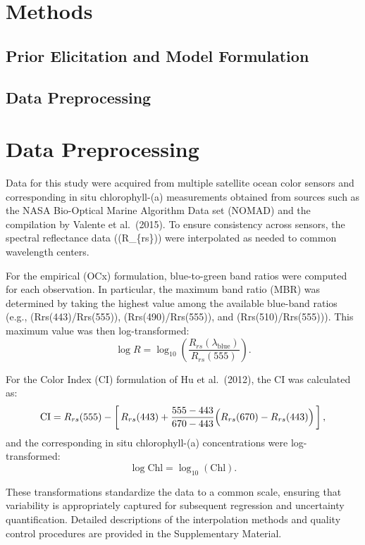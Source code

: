\documentclass[
]{agujournal2019}
\begin{document}
\section{Methods}\label{methods}

\subsection{Prior Elicitation and Model
Formulation}\label{prior-elicitation-and-model-formulation}

\subsection{Data Preprocessing}\label{data-preprocessing}

\section{Data Preprocessing}

Data for this study were acquired from multiple satellite ocean color
sensors and corresponding in situ chlorophyll-(a) measurements obtained
from sources such as the NASA Bio-Optical Marine Algorithm Data set
(NOMAD) and the compilation by Valente et al.~(2015). To ensure
consistency across sensors, the spectral reflectance data ((R\_\{rs\}))
were interpolated as needed to common wavelength centers.

For the empirical (OCx) formulation, blue-to-green band ratios were
computed for each observation. In particular, the maximum band ratio
(MBR) was determined by taking the highest value among the available
blue-band ratios (e.g., (Rrs(443)/Rrs(555)), (Rrs(490)/Rrs(555)), and
(Rrs(510)/Rrs(555))). This maximum value was then log-transformed: \[
\log R = \log_{10}\left(\frac{R_{rs}(\lambda_{\text{blue}})}{R_{rs}(555)}\right).
\]

For the Color Index (CI) formulation of Hu et al.~(2012), the CI was
calculated as: \[
\text{CI} = R_{rs}(555) - \left[\,R_{rs}(443) + \frac{555-443}{670-443}\Bigl(R_{rs}(670) - R_{rs}(443)\Bigr)\,\right],
\] and the corresponding in situ chlorophyll-(a) concentrations were
log-transformed: \[
\log \text{Chl} = \log_{10}(\text{Chl}).
\]

These transformations standardize the data to a common scale, ensuring
that variability is appropriately captured for subsequent regression and
uncertainty quantification. Detailed descriptions of the interpolation
methods and quality control procedures are provided in the Supplementary
Material.
\end{document}
